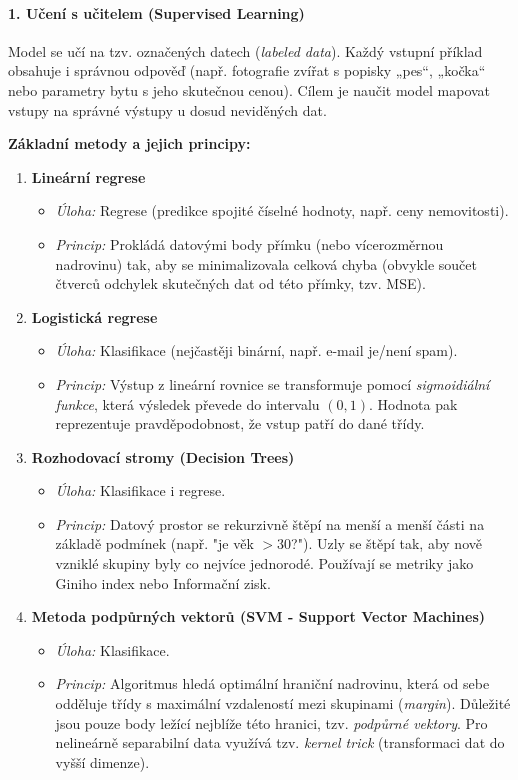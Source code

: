 \paragraph*{1. Učení s učitelem (Supervised Learning)}
Model se učí na tzv. označených datech (\textit{labeled data}). Každý vstupní příklad obsahuje i správnou odpověď (např. fotografie zvířat s popisky „pes“, „kočka“ nebo parametry bytu s jeho skutečnou cenou). Cílem je naučit model mapovat vstupy na správné výstupy u dosud neviděných dat.

\textbf{Základní metody a jejich principy:}
\begin{enumerate}
    \item \textbf{Lineární regrese} 
    \begin{itemize}
        \item \textit{Úloha:} Regrese (predikce spojité číselné hodnoty, např. ceny nemovitosti).
        \item \textit{Princip:} Prokládá datovými body přímku (nebo vícerozměrnou nadrovinu) tak, aby se minimalizovala celková chyba (obvykle součet čtverců odchylek skutečných dat od této přímky, tzv. MSE).
    \end{itemize}
    \item \textbf{Logistická regrese}
    \begin{itemize}
        \item \textit{Úloha:} Klasifikace (nejčastěji binární, např. e-mail je/není spam).
        \item \textit{Princip:} Výstup z lineární rovnice se transformuje pomocí \textit{sigmoidiální funkce}, která výsledek převede do intervalu $(0, 1)$. Hodnota pak reprezentuje pravděpodobnost, že vstup patří do dané třídy.
    \end{itemize}
    \item \textbf{Rozhodovací stromy (Decision Trees)}
    \begin{itemize}
        \item \textit{Úloha:} Klasifikace i regrese.
        \item \textit{Princip:} Datový prostor se rekurzivně štěpí na menší a menší části na základě podmínek (např. "je věk $> 30$?"). Uzly se štěpí tak, aby nově vzniklé skupiny byly co nejvíce jednorodé. Používají se metriky jako Giniho index nebo Informační zisk.
    \end{itemize}
    \item \textbf{Metoda podpůrných vektorů (SVM - Support Vector Machines)}
    \begin{itemize}
        \item \textit{Úloha:} Klasifikace.
        \item \textit{Princip:} Algoritmus hledá optimální hraniční nadrovinu, která od sebe odděluje třídy s maximální vzdaleností mezi skupinami (\textit{margin}). Důležité jsou pouze body ležící nejblíže této hranici, tzv. \textit{podpůrné vektory}. Pro nelineárně separabilní data využívá tzv. \textit{kernel trick} (transformaci dat do vyšší dimenze).
    \end{itemize}
\end{enumerate}

